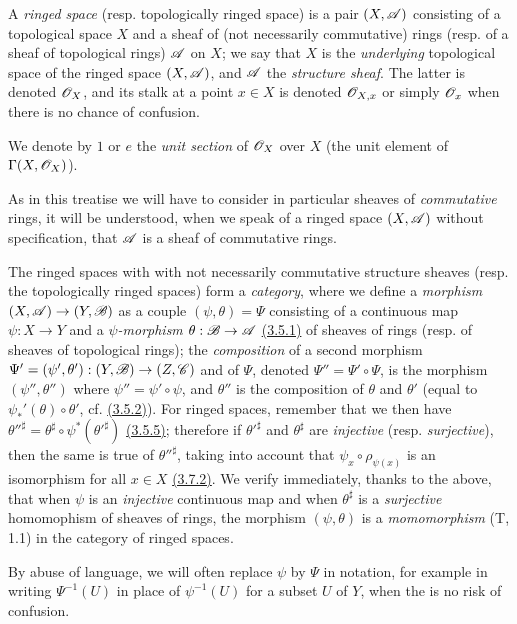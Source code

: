 \begin{env}[4.1.1]
\label{env-0.4.1.1}
A {\em ringed space} (resp. topologically ringed space) is a pair $(X,\mathscr{A})$
consisting of a topological space $X$ and a sheaf of (not necessarily
commutative) rings (resp. of a sheaf of topological rings) $\mathscr{A}$ on $X$; we
say that $X$ is the {\em underlying} topological space of the ringed space
$(X,\mathscr{A})$, and $\mathscr{A}$ the {\em structure sheaf}. The latter is denoted
$\mathscr{O}_X$, and its stalk at a point $x\in X$ is denoted $\mathscr{O}_{X,x}$ or simply
$\mathscr{O}_x$ when there is no chance of confusion.

We denote by $1$ or $e$ the {\em unit section} of $\mathscr{O}_X$ over $X$ (the unit
element of $\Gamma(X,\mathscr{O}_X)$).

As in this treatise we will have to consider in particular sheaves of
{\em commutative} rings, it will be understood, when we speak of a ringed space
$(X,\mathscr{A})$ without specification, that $\mathscr{A}$ is a sheaf of commutative
rings.

The ringed spaces with with not necessarily commutative structure sheaves
(resp. the topologically ringed spaces) form a {\em category}, where we define
a {\em morphism} $(X,\mathscr{A})\to(Y,\mathscr{B})$ as a couple $(\psi,\theta)=\Psi$
consisting of a continuous map $\psi:X\to Y$ and a {\em $\psi$-morphism}
$\theta:\mathscr{B}\to\mathscr{A}$ \hyperref[env-0.3.5.1]{(3.5.1)} of sheaves of rings (resp. of sheaves
of topological rings); the {\em composition} of a second morphism
$\Psi'=(\psi',\theta'):(Y,\mathscr{B})\to(Z,\mathscr{C})$ and of $\Psi$, denoted
$\Psi''=\Psi'\circ\Psi$, is the morphism $(\psi'',\theta'')$ where
$\psi''=\psi'\circ\psi$, and $\theta''$ is the composition of $\theta$ and
$\theta'$ (equal to $\psi_*'(\theta)\circ\theta'$, cf. \hyperref[env-0.3.5.2]{(3.5.2)}). For
ringed spaces, remember that we then have
${\theta''}^\sharp=\theta^\sharp\circ\psi^*({\theta'}^\sharp)$
\hyperref[env-0.3.5.5]{(3.5.5)}; therefore if ${\theta'}^\sharp$ and $\theta^\sharp$ are
{\em injective} (resp. {\em surjective}), then the same is true of
${\theta''}^\sharp$, taking into account that $\psi_x\circ\rho_{\psi(x)}$ is an
isomorphism for all $x\in X$ \hyperref[env-0.3.7.2]{(3.7.2)}. We verify immediately, thanks to
the above, that when $\psi$ is an {\em injective} continuous map and when
$\theta^\sharp$ is a {\em surjective} homomophism of sheaves of rings, the
morphism $(\psi,\theta)$ is a {\em momomorphism} (T, 1.1) in the category of
ringed spaces.

By abuse of language, we will often replace $\psi$ by $\Psi$ in notation, for
example in writing $\Psi^{-1}(U)$ in place of $\psi^{-1}(U)$ for a subset $U$ of
$Y$, when the is no risk of confusion.
\end{env}

